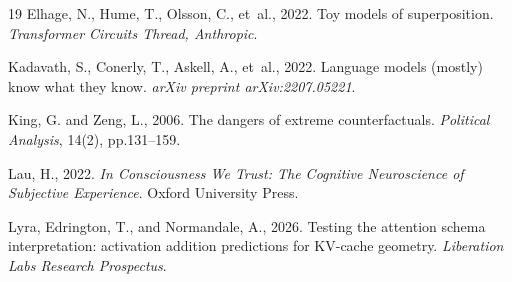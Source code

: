 \documentclass[11pt,a4paper]{article}
\begin{document}
\begin{thebibliography}{19}
Elhage, N., Hume, T., Olsson, C., et~al., 2022. Toy models of
superposition. \textit{Transformer Circuits Thread, Anthropic}.

Kadavath, S., Conerly, T., Askell, A., et~al., 2022. Language models
(mostly) know what they know. \textit{arXiv preprint arXiv:2207.05221}.

King, G. and Zeng, L., 2006. The dangers of extreme counterfactuals.
\textit{Political Analysis}, 14(2), pp.131--159.

Lau, H., 2022. \textit{In Consciousness We Trust: The Cognitive
Neuroscience of Subjective Experience}. Oxford University Press.

Lyra, Edrington, T., and Normandale, A., 2026. Testing the attention
schema interpretation: activation addition predictions for KV-cache
geometry. \textit{Liberation Labs Research Prospectus}.

\end{thebibliography}
\end{document}
